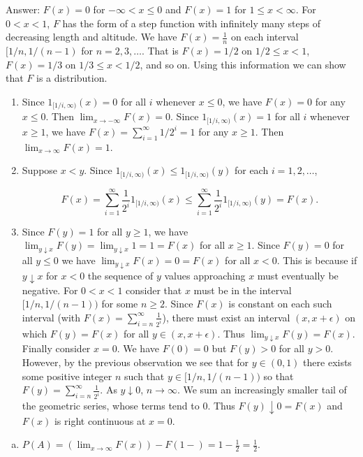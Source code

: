 \documentclass{article}
\begin{document}
{Answer: $F(x) = 0$ for $-\infty < x \leq 0$ and $F(x) = 1$  for $1 \leq x < \infty$. For $0<x<1$, $F$ has the form of a step function with infinitely many steps of decreasing length and altitude. We have $F(x) = \frac{1}{n}$ on each interval $[1/n, 1/(n-1)$ for $n = 2,3,\dots$. That is $F(x) = 1/2$ on $1/2 \leq x < 1$, $F(x) = 1/3$ on $1/3 \leq x < 1/2$, and so on. Using this information we can show that $F$ is a distribution. 

\begin{enumerate}
\item Since $1_{[1/i, \infty)}(x) = 0$ for all $i$ whenever $x \leq 0$, we have $F(x) = 0$ for any $x \leq 0$. Then $\lim_{x\rightarrow -\infty} F(x) = 0$. Since $1_{[1/i, \infty)}(x) = 1$ for all $i$ whenever $x \geq 1$, we have $F(x) = \sum_{i = 1}^\infty 1/2^i = 1$ for any $x \geq 1$. Then $\lim_{x \rightarrow \infty} F(x) = 1$.

\item Suppose $x < y$. Since $1_{[1/i , \infty)}(x) \leq 1_{[1/i, \infty)}(y)$ for each $i = 1,2,\dots$,

$$
F(x) = \sum_{i=1}^\infty \frac{1}{2^i}1_{[1/i, \infty)}(x) \leq \sum_{i=1}^\infty \frac{1}{2^i}1_{[1/i, \infty)}(y) = F(x).
$$

\item Since $F(y) = 1$ for all $y \geq 1$, we have $\lim_{y \downarrow x} F(y) = \lim_{y \downarrow x} 1 = 1 = F(x)$ for all $x \geq 1$. Since $F(y) = 0$ for all $y \leq 0$ we have $\lim_{y \downarrow x} F(x) = 0 = F(x)$ for all $x < 0$. This is because if $y\downarrow x$ for $x<0$ the sequence of $y$ values approaching $x$ must eventually be negative. For $0<x<1$ consider that $x$ must be in the interval $[1/n, 1/(n-1))$ for some $n \geq 2$. Since $F(x)$ is constant on each such interval (with $F(x) = \sum_{i=n}^\infty \frac{1}{2^i}$), there must exist an interval $(x,x + \epsilon)$ on which $F(y) = F(x)$ for all $y \in (x,x+\epsilon)$. Thus $\lim_{y \downarrow x} F(y) = F(x)$. Finally consider $x = 0$. We have $F(0) = 0$ but $F(y) > 0$ for all $y > 0$. However, by the previous observation we see that for $y \in (0,1)$ there exists some positive integer $n$ such that $y \in [1/n, 1/(n-1))$ so that $F(y) = \sum_{i=n}^\infty \frac{1}{2^i}$. As $y \downarrow 0$, $n \rightarrow \infty$. We sum an increasingly smaller tail of the geometric series, whose terms tend to 0. Thus $F(y) \downarrow 0 = F(x)$ and $F(x)$ is right continuous at $x = 0$. 
\end{enumerate}

\begin{enumerate}[a)]
\item $P(A) = (\lim_{x\rightarrow \infty} F(x)) - F(1-) = 1 - \frac{1}{2} = \frac{1}{2}$.


\end{enumerate}}
\end{document}
